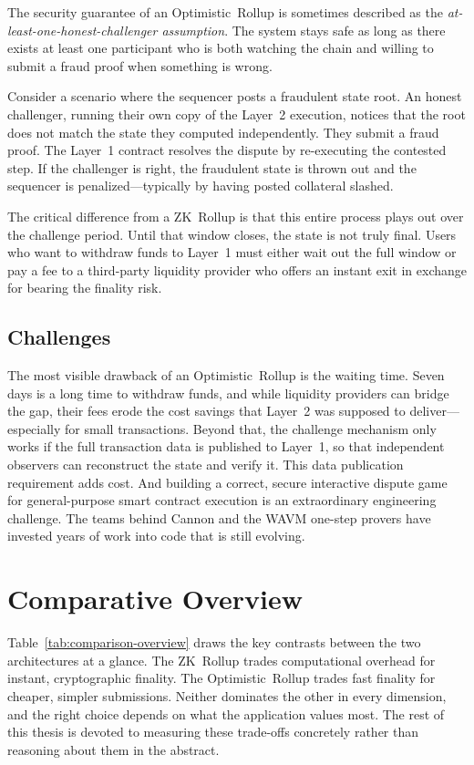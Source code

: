 The security guarantee of an Optimistic~Rollup is sometimes described as the \textit{at-least-one-honest-challenger assumption}. The system stays safe as long as there exists at least one participant who is both watching the chain and willing to submit a fraud proof when something is wrong.

Consider a scenario where the sequencer posts a fraudulent state root. An honest challenger, running their own copy of the Layer~2 execution, notices that the root does not match the state they computed independently. They submit a fraud proof. The Layer~1 contract resolves the dispute by re-executing the contested step. If the challenger is right, the fraudulent state is thrown out and the sequencer is penalized---typically by having posted collateral slashed.

The critical difference from a ZK~Rollup is that this entire process plays out over the challenge period. Until that window closes, the state is not truly final. Users who want to withdraw funds to Layer~1 must either wait out the full window or pay a fee to a third-party liquidity provider who offers an instant exit in exchange for bearing the finality risk.

\subsection{Challenges}

The most visible drawback of an Optimistic~Rollup is the waiting time. Seven days is a long time to withdraw funds, and while liquidity providers can bridge the gap, their fees erode the cost savings that Layer~2 was supposed to deliver---especially for small transactions. Beyond that, the challenge mechanism only works if the full transaction data is published to Layer~1, so that independent observers can reconstruct the state and verify it. This data publication requirement adds cost. And building a correct, secure interactive dispute game for general-purpose smart contract execution is an extraordinary engineering challenge. The teams behind Cannon and the WAVM one-step provers have invested years of work into code that is still evolving.

\section{Comparative Overview}

Table~\ref{tab:comparison-overview} draws the key contrasts between the two architectures at a glance. The ZK~Rollup trades computational overhead for instant, cryptographic finality. The Optimistic~Rollup trades fast finality for cheaper, simpler submissions. Neither dominates the other in every dimension, and the right choice depends on what the application values most. The rest of this thesis is devoted to measuring these trade-offs concretely rather than reasoning about them in the abstract.


